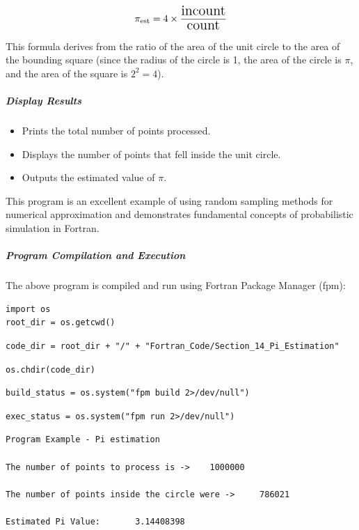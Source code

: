 \begin{equation}
\Large \pi_{\text{est}} = 4 \times \frac{\text{incount}}{\text{count}}
\end{equation}

This formula derives from the ratio of the area of the unit circle to the area of the bounding square (since the radius of the circle is 1, the area of the circle is $\pi$, and the area of the square is $2^2 = 4$).

\subparagraph{Display Results}

\begin{itemize}
\item Prints the total number of points processed.
\item Displays the number of points that fell inside the unit circle.
\item Outputs the estimated value of $\pi$.
\end{itemize}

This program is an excellent example of using random sampling methods for numerical approximation and demonstrates fundamental concepts of probabilistic simulation in Fortran.

\subparagraph{Program Compilation and Execution}

The above program is compiled and run using Fortran Package Manager (fpm):

\begin{verbatim}
import os
root_dir = os.getcwd()
\end{verbatim}

\begin{verbatim}
code_dir = root_dir + "/" + "Fortran_Code/Section_14_Pi_Estimation"
\end{verbatim}

\begin{verbatim}
os.chdir(code_dir)
\end{verbatim}

\begin{verbatim}
build_status = os.system("fpm build 2>/dev/null")
\end{verbatim}

\begin{verbatim}
exec_status = os.system("fpm run 2>/dev/null")
\end{verbatim}

\begin{verbatim}
Program Example - Pi estimation

The number of points to process is ->    1000000

The number of points inside the circle were ->     786021

Estimated Pi Value:       3.14408398
\end{verbatim}
